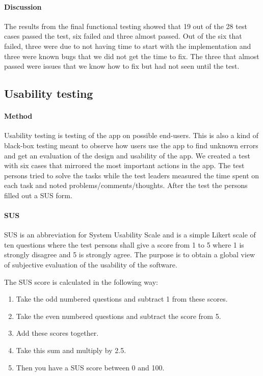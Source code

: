 \paragraph{Discussion}\hfill
\newline
The results from the final functional testing showed that 19 out of the 28 test cases passed the test,  six failed and three almost passed. Out of the six that failed, three were due to not having time to start with the implementation and three were known bugs that we did not get the time to fix. The three that almost passed were issues that we know how to fix but had not seen until the test.


\subsection{Usability testing}\label{subsec:usabilitytesting}
\paragraph{Method}\hfill
\newline
Usability testing is testing of the app on possible end-users. This is also a kind of black-box testing meant to observe how users use the app to find unknown errors and get an evaluation of the design and usability of the app. We created a test with six cases that mirrored the most important actions in the app. The test persons tried to solve the tasks while the test leaders measured the time spent on each task and noted problems/comments/thoughts. After the test the persons filled out a SUS form.
\paragraph{SUS}\hfill
\newline
SUS is an abbreviation for System Usability Scale \cite{bib:sus} and is a simple Likert scale of ten questions where the test persons shall give a score from 1 to 5 where 1 is strongly disagree and 5 is strongly agree. The purpose is to obtain a global view of subjective evaluation of the usability of the software.

\newpage

			The SUS score is calculated in the following way:
				\begin{enumerate}
					\item{}Take the odd numbered questions and subtract 1 from these scores.
					\item{}Take the even numbered questions and subtract the score from 5.
					\item{}Add these scores together. 
					\item{}Take this sum and multiply by 2.5.
					\item{}Then you have a SUS score between 0 and 100.
				\end{enumerate}
